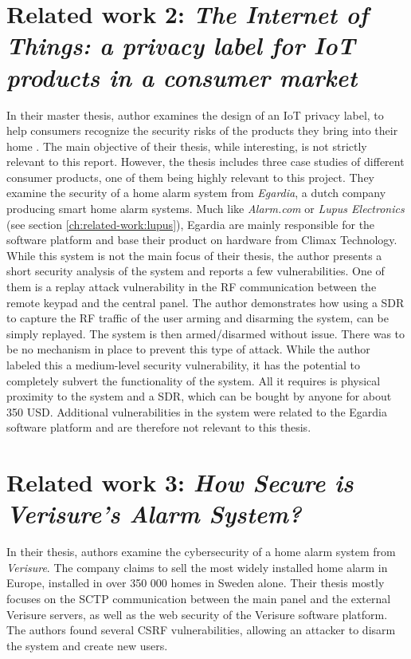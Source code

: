 \section{Related work 2: \textit{The Internet of Things: a privacy label for IoT products in a consumer market}}
In their master thesis, author \citeauthor{iotprivacylabel} examines the design of an IoT privacy label, to help consumers recognize the security risks of the products they bring into their home \cite{iotprivacylabel}. The main objective of their thesis, while interesting, is not strictly relevant to this report. However, the thesis includes three case studies of different consumer products, one of them being highly relevant to this project. They examine the security of a home alarm system from \textit{Egardia}, a dutch company producing smart home alarm systems. Much like \textit{Alarm.com} or \textit{Lupus Electronics} (see section \ref{ch:related-work:lupus}), Egardia are mainly responsible for the software platform and base their product on hardware from Climax Technology. While this system is not the main focus of their thesis, the author presents a short security analysis of the system and reports a few vulnerabilities. One of them is a replay attack vulnerability in the \gls{RF} communication between the remote keypad and the central panel. The author demonstrates how using a \gls{SDR} to capture the \gls{RF} traffic of the user arming and disarming the system, can be simply replayed. The system is then armed/disarmed without issue. There was to be no mechanism in place to prevent this type of attack. While the author labeled this a medium-level security vulnerability, it has the potential to completely subvert the functionality of the system. All it requires is physical proximity to the system and a \gls{SDR}, which can be bought by anyone for about 350 USD. Additional vulnerabilities in the system were related to the Egardia software platform and are therefore not relevant to this thesis.

\section{Related work 3: \textit{How Secure is Verisure’s Alarm System?}}
In their thesis, authors \citeauthor{verisurethesis} examine the cybersecurity of a home alarm system from \textit{Verisure}. The company claims to sell the most widely installed home alarm in Europe, installed in over 350 000 homes in Sweden alone. Their thesis mostly focuses on the SCTP communication between the main panel and the external Verisure servers, as well as the web security of the Verisure software platform. The authors found several \gls{CSRF} vulnerabilities, allowing an attacker to disarm the system and create new users.

